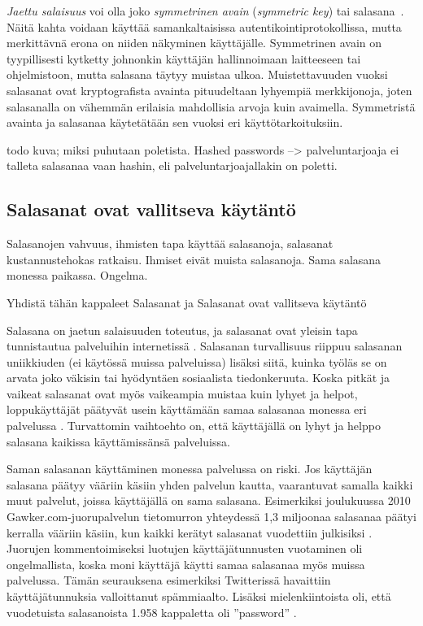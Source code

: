 \documentclass[finnish,gradu]{tktltiki}
\begin{document}
  \emph{Jaettu salaisuus} voi olla joko \emph{symmetrinen avain} (\emph{symmetric key}) tai salasana~\cite{NIST_SP800-63-1}. Näitä kahta voidaan käyttää samankaltaisissa autentikointiprotokollissa, mutta merkittävnä erona on niiden näkyminen käyttäjälle. Symmetrinen avain on tyypillisesti kytketty johnonkin käyttäjän hallinnoimaan laitteeseen tai ohjelmistoon, mutta salasana täytyy muistaa ulkoa. Muistettavuuden vuoksi salasanat ovat kryptografista avainta pituudeltaan lyhyempiä merkkijonoja, joten salasanalla on vähemmän erilaisia mahdollisia arvoja kuin avaimella. Symmetristä avainta ja salasanaa käytetätään sen vuoksi eri käyttötarkoituksiin.

  todo kuva; miksi puhutaan poletista. Hashed passwords --> palveluntarjoaja ei talleta salasanaa vaan hashin, eli palveluntarjoajallakin on poletti.



  \subsection{Salasanat ovat vallitseva käytäntö} %
  \label{sub:salasanat}
  Salasanojen vahvuus, ihmisten tapa käyttää salasanoja, salasanat kustannustehokas ratkaisu.
  Ihmiset eivät muista salasanoja. Sama salasana monessa paikassa. Ongelma.

  Yhdistä tähän kappaleet Salasanat ja Salasanat ovat vallitseva käytäntö

  Salasana on jaetun salaisuuden toteutus, ja salasanat ovat yleisin tapa tunnistautua palveluihin internetissä \cite{study_of_passwords_07, passpet_06, password_management_strategies_06, pwdhash_extension_05}.
  Salasanan turvallisuus riippuu salasanan uniikkiuden (ei käytössä muissa palveluissa) lisäksi siitä, kuinka työläs se on arvata joko väkisin tai hyödyntäen sosiaalista tiedonkeruuta. Koska pitkät ja vaikeat salasanat ovat myös vaikeampia muistaa kuin lyhyet ja helpot, loppukäyttäjät päätyvät usein käyttämään samaa salasanaa monessa eri palvelussa \cite{study_of_passwords_07}. Turvattomin vaihtoehto on, että käyttäjällä on lyhyt ja helppo salasana kaikissa käyttämissänsä palveluissa.

  Saman salasanan käyttäminen monessa palvelussa on riski. Jos käyttäjän salasana päätyy vääriin käsiin yhden palvelun kautta, vaarantuvat samalla kaikki muut palvelut, joissa käyttäjällä on sama salasana. Esimerkiksi joulukuussa 2010 Gawker.com-juorupalvelun tietomurron yhteydessä 1,3 miljoonaa salasanaa päätyi kerralla vääriin käsiin, kun kaikki kerätyt salasanat vuodettiin julkisiksi \cite{bbc_gawker_12_2010, forbes_gawker_12_2010}. Juorujen kommentoimiseksi luotujen käyttäjätunnusten vuotaminen oli ongelmallista, koska moni käyttäjä käytti samaa salasanaa myös muissa palvelussa. Tämän seurauksena esimerkiksi Twitterissä havaittiin käyttäjätunnuksia valloittanut spämmiaalto. Lisäksi mielenkiintoista oli, että vuodetuista salasanoista 1.958 kappaletta oli ''password'' \cite{forbes_gawker_12_2010}.
\end{document}
